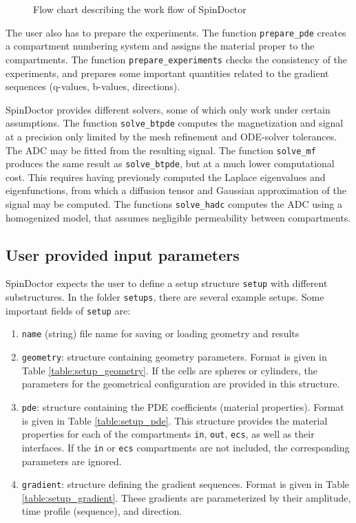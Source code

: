 \documentclass[a4paper]{article}
\begin{document}
\begin{figure}
    
    \caption{Flow chart describing the work flow of SpinDoctor}
    \label{flowchart}
\end{figure}

The user also has to prepare the experiments. The function \verb+prepare_pde+ creates a compartment numbering system and assigns the material proper to the compartments. The function \verb+prepare_experiments+ checks the consistency of the experiments, and prepares some important quantities related to the gradient sequences (q-values, b-values, directions).

SpinDoctor provides different solvers, some of which only work under certain assumptions. The function \verb+solve_btpde+ computes the magnetization and signal at a precision only limited by the mesh refinement and ODE-solver tolerances. The ADC may be fitted from the resulting signal. The function \verb+solve_mf+ produces the same result as \verb+solve_btpde+, but at a much lower computational cost. This requires having previously computed the Laplace eigenvalues and eigenfunctions, from which a diffusion tensor and Gaussian approximation of the signal may be computed. The functions \verb+solve_hadc+ computes the ADC using a homogenized model, that assumes negligible permeability between compartments.


\subsection{User provided input parameters}

SpinDoctor expects the user to define a setup structure \verb+setup+ with different substructures. In the folder \verb+setups+, there are several example setups. Some important fields of \verb+setup+ are:
\begin{enumerate}
    \item \verb+name+ (string) file name for saving or loading geometry and results
    \item \verb+geometry+: structure containing geometry parameters. Format is given in Table \ref{table:setup_geometry}. If the cells are spheres or cylinders, the parameters for the geometrical configuration are provided in this structure.
    \item \verb+pde+: structure containing the PDE coefficients (material properties). Format is given in Table \ref{table:setup_pde}. This structure provides the material properties for each of the compartments \verb+in+, \verb+out+, \verb+ecs+, as well as their interfaces. If the \verb+in+ or \verb+ecs+ compartments are not included, the corresponding parameters are ignored.
    \item \verb+gradient+: structure defining the gradient sequences. Format is given in Table \ref{table:setup_gradient}. These gradients are parameterized by their amplitude, time profile (sequence), and direction.
\end{enumerate}
\end{document}
